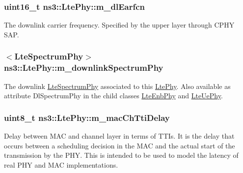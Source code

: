 \subsubsection[{\texorpdfstring{m\+\_\+dl\+Earfcn}{m_dlEarfcn}}]{\setlength{\rightskip}{0pt plus 5cm}uint16\+\_\+t ns3\+::\+Lte\+Phy\+::m\+\_\+dl\+Earfcn\hspace{0.3cm}{\ttfamily [protected]}}\hypertarget{classns3_1_1LtePhy_ac8fee98bfc4a1b1b5f3bbb6d721b3474}{}\label{classns3_1_1LtePhy_ac8fee98bfc4a1b1b5f3bbb6d721b3474}
The downlink carrier frequency. Specified by the upper layer through C\+P\+HY S\+AP. 
\subsubsection[{\texorpdfstring{m\+\_\+downlink\+Spectrum\+Phy}{m_downlinkSpectrumPhy}}]{$<${\bf Lte\+Spectrum\+Phy}$>$ ns3\+::\+Lte\+Phy\+::m\+\_\+downlink\+Spectrum\+Phy\hspace{0.3cm}{\ttfamily [protected]}}\hypertarget{classns3_1_1LtePhy_a9d9d4f9b07919b941583dca6f4789762}{}\label{classns3_1_1LtePhy_a9d9d4f9b07919b941583dca6f4789762}
The downlink \hyperlink{classns3_1_1LteSpectrumPhy}{Lte\+Spectrum\+Phy} associated to this \hyperlink{classns3_1_1LtePhy}{Lte\+Phy}. Also available as attribute {\ttfamily Dl\+Spectrum\+Phy} in the child classes \hyperlink{classns3_1_1LteEnbPhy}{Lte\+Enb\+Phy} and \hyperlink{classns3_1_1LteUePhy}{Lte\+Ue\+Phy}. 
\subsubsection[{\texorpdfstring{m\+\_\+mac\+Ch\+Tti\+Delay}{m_macChTtiDelay}}]{\setlength{\rightskip}{0pt plus 5cm}uint8\+\_\+t ns3\+::\+Lte\+Phy\+::m\+\_\+mac\+Ch\+Tti\+Delay\hspace{0.3cm}{\ttfamily [protected]}}\hypertarget{classns3_1_1LtePhy_affeee2ab376466f7e8097ef3e3c3279e}{}\label{classns3_1_1LtePhy_affeee2ab376466f7e8097ef3e3c3279e}
Delay between M\+AC and channel layer in terms of T\+T\+Is. It is the delay that occurs between a scheduling decision in the M\+AC and the actual start of the transmission by the P\+HY. This is intended to be used to model the latency of real P\+HY and M\+AC implementations.


